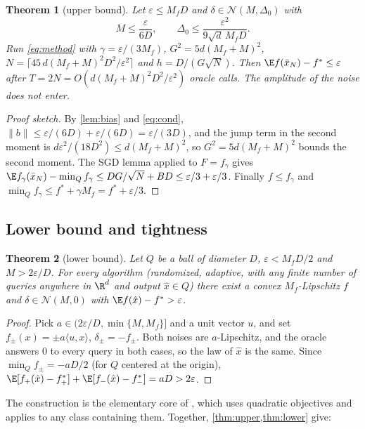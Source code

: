 \documentclass{article} %
\renewcommand{\eps}{\varepsilon}
\newcommand{\cN}{\mathcal{N}}
\newcommand{\ip}[2]{\langle #1,#2\rangle}
\newcommand{\norm}[1]{\lVert #1\rVert}
\theoremstyle{plain}
\newtheorem{theorem}{Theorem}
\theoremstyle{definition}
\theoremstyle{remark}
\begin{document}
\begin{theorem}[upper bound]\label{thm:upper}
Let $\eps\le M_fD$ and $\delta\in\cN(M,\Delta_0)$ with
\begin{equation}\label{eq:cond}
  M\le\frac{\eps}{6D},\qquad \Delta_0\le\frac{\eps^2}{9\sqrt d\,M_fD}.
\end{equation}
Run \eqref{eq:method} with $\gamma=\eps/(3M_f)$, $G^2=5d(M_f+M)^2$, $N=\lceil45\,d(M_f+M)^2D^2/\eps^2\rceil$ and $h=D/(G\sqrt N)$. Then $\E f(\bar x_N)-f^*\le\eps$ after $T=2N=O(d(M_f+M)^2D^2/\eps^2)$ oracle calls. The amplitude of the noise does not enter.
\end{theorem}

\begin{proof}[Proof sketch]
By \cref{lem:bias} and \eqref{eq:cond}, $\norm b\le\eps/(6D)+\eps/(6D)=\eps/(3D)$, and the jump term in the second moment is $d\eps^2/(18D^2)\le d(M_f+M)^2$, so $G^2=5d(M_f+M)^2$ bounds the second moment. The SGD lemma applied to $F=f_\gamma$ gives $\E f_\gamma(\bar x_N)-\min_Qf_\gamma\le DG/\sqrt N+BD\le\eps/3+\eps/3$. Finally $f\le f_\gamma$ and $\min_Qf_\gamma\le f^*+\gamma M_f=f^*+\eps/3$.
\end{proof}

\subsection{Lower bound and tightness}

\begin{theorem}[lower bound]\label{thm:lower}
Let $Q$ be a ball of diameter $D$, $\eps<M_fD/2$ and $M>2\eps/D$. For every algorithm (randomized, adaptive, with any finite number of queries anywhere in $\R^d$ and output $\hat x\in Q$) there exist a convex $M_f$-Lipschitz $f$ and $\delta\in\cN(M,0)$ with $\E f(\hat x)-f^*>\eps$.
\end{theorem}

\begin{proof}
Pick $a\in(2\eps/D,\min\{M,M_f\}]$ and a unit vector $u$, and set $f_\pm(x)=\pm a\ip ux$, $\delta_\pm=-f_\pm$. Both noises are $a$-Lipschitz, and the oracle answers $0$ to every query in both cases, so the law of $\hat x$ is the same. Since $\min_Qf_\pm=-aD/2$ (for $Q$ centered at the origin), $\E[f_+(\hat x)-f_+^*]+\E[f_-(\hat x)-f_-^*]=aD>2\eps$.
\end{proof}

The construction is the elementary core of \citet[Prop.~E.7]{loginov2026minimax}, which uses quadratic objectives and applies to any class containing them. Together, \cref{thm:upper,thm:lower} give:
\end{document}
